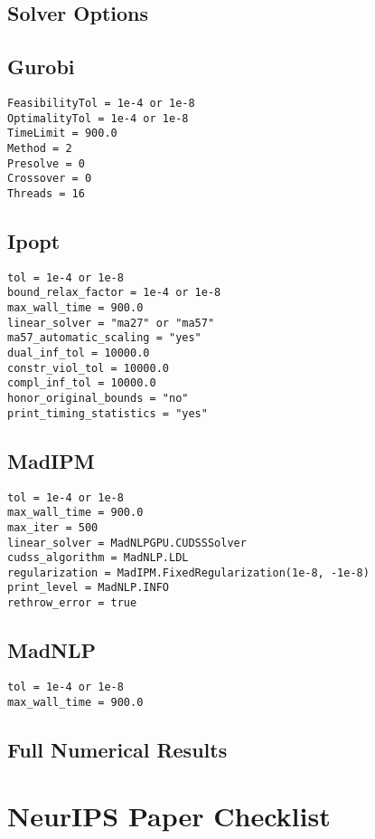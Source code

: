 \documentclass{article}
\begin{document}
\subsection{Solver Options}
\subsection{Gurobi}
\begin{verbatim}
FeasibilityTol = 1e-4 or 1e-8
OptimalityTol = 1e-4 or 1e-8
TimeLimit = 900.0
Method = 2
Presolve = 0
Crossover = 0
Threads = 16
\end{verbatim}
\subsection{Ipopt}
\begin{verbatim}
tol = 1e-4 or 1e-8
bound_relax_factor = 1e-4 or 1e-8
max_wall_time = 900.0
linear_solver = "ma27" or "ma57"
ma57_automatic_scaling = "yes"
dual_inf_tol = 10000.0
constr_viol_tol = 10000.0
compl_inf_tol = 10000.0
honor_original_bounds = "no"
print_timing_statistics = "yes"
\end{verbatim}
\subsection{MadIPM} 
\begin{verbatim}
tol = 1e-4 or 1e-8
max_wall_time = 900.0
max_iter = 500
linear_solver = MadNLPGPU.CUDSSSolver
cudss_algorithm = MadNLP.LDL
regularization = MadIPM.FixedRegularization(1e-8, -1e-8)
print_level = MadNLP.INFO
rethrow_error = true
\end{verbatim}
\subsection{MadNLP}
\begin{verbatim}
tol = 1e-4 or 1e-8
max_wall_time = 900.0
\end{verbatim}
\subsection{Full Numerical Results}







\newpage
\section*{NeurIPS Paper Checklist}
\end{document}
